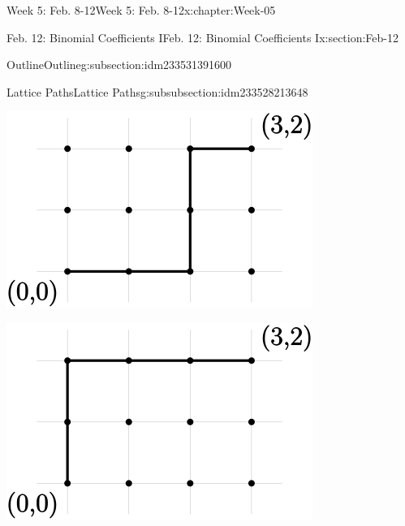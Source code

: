 \documentclass[oneside,10pt,]{book}
\numberwithin{equation}{section}
\begin{document}
\begin{chapterptx}{Week 5: Feb. 8-12}{}{Week 5: Feb. 8-12}{}{}{x:chapter:Week-05}
\begin{sectionptx}{Feb. 12: Binomial Coefficients I}{}{Feb. 12: Binomial Coefficients I}{}{}{x:section:Feb-12}
\begin{subsectionptx}{Outline}{}{Outline}{}{}{g:subsection:idm233531391600}
\begin{subsubsectionptx}{Lattice Paths}{}{Lattice Paths}{}{}{g:subsubsection:idm233528213648}
\begin{sidebyside}{3}{0.0166666666666667}{0.0166666666666667}{0.0333333333333333}
\begin{sbspanel}{0.3}
\includegraphics[width=\linewidth]{./img/lattice-path-1.svg}
\end{sbspanel}%
\begin{sbspanel}{0.3}%
\includegraphics[width=\linewidth]{./img/lattice-path-2.svg}
\end{sbspanel}%
\begin{sbspanel}{0.3}%

\end{sbspanel}
\end{sidebyside}
\end{subsubsectionptx}
\end{subsectionptx}
\end{sectionptx}
\end{chapterptx}
\end{document}
